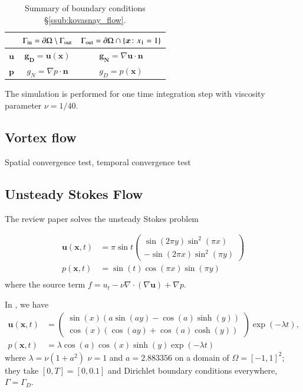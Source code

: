 \begin{table}[htpb]
  \centering
  \begin{tabular}{ccc}
  \hline
    & $\Gamma_{\text{in}} = \partial\Omega \setminus \Gamma_{\text{out}}$ & $\Gamma_{\text{out}} = \partial\Omega \cap \left\{\bm{x}\colon x_1 = 1\right\}$ \\
  \hline
  $\bm{u}$ & $\bm{g_D} = \bm{u}(\bm{x})$ & $\bm{g_N} = \nabla \bm{u}\cdot\bm{n}$ \\
  $\bm{p}$ & $g_N = \nabla p\cdot\bm{n}$ & $g_D = p(\bm{x})$ \\
  \hline
  \end{tabular}
  \caption{Summary of boundary conditions \S\ref{ssub:kovasnay_flow}.}
  \label{tab:Kovasnay_BCs}
\end{table}

The simulation is performed for one time integration step with viscosity parameter $\nu = 1/40$.

\subsection{Vortex flow}
Spatial convergence test, temporal convergence test

\subsection{Unsteady Stokes Flow}

The review paper \cite{guermond_overview_2006} solves the unsteady Stokes problem

\begin{equation}
  \begin{aligned}
    \bm{u}(\bm{x}, t) &= \pi \sin t 
    \begin{pmatrix}
      \sin( 2\pi y) \sin^2( \pi x) \\
      -\sin(2 \pi x) \sin^2(\pi y)
    \end{pmatrix} \\
    p(\bm{x}, t) &= \sin(t)\cos(\pi x) \sin(\pi y)\\
  \end{aligned}
  \label{eq:MS_stokes_guermond}
\end{equation}
where the source term $f= u_t -\nu \nabla \cdot( \nabla \bm{u} ) + \nabla p $.

In \cite{fehn_stability_2017}, we have
\begin{equation}
  \begin{aligned}
  \bm{u}(\bm{x}, t) &= 
  \begin{pmatrix}
    \sin(x) (a\sin(a y) - \cos(a)\sinh(y)) \\
    \cos(x) (\cos(a y) + \cos(a)\cosh(y))
  \end{pmatrix}
  \exp(-\lambda t),\\
    p(\bm{x}, t) &= \lambda \cos(a) \cos(x) \sinh(y) \exp(-\lambda t)
  \end{aligned}
  \label{eq:MS_unsteady_stokes_fehn}
\end{equation}
where $\lambda = \nu(1 + a^2)$ $\nu = 1$ and $a = 2.883356$ on a domain of  $\Omega = [-1, 1]^2$; they take $[0, T] = [0, 0.1]$ and Dirichlet boundary conditions everywhere, $\Gamma = \Gamma_D$.



